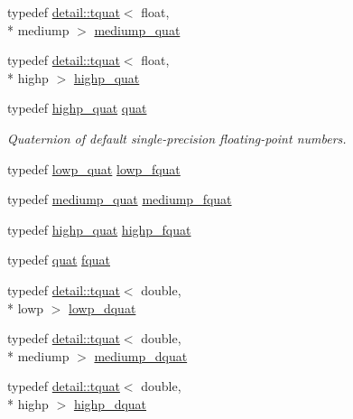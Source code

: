 \begin{DoxyCompactItemize}
typedef \hyperlink{structglm_1_1detail_1_1tquat}{detail\-::tquat}$<$ float, \\*
mediump $>$ \hyperlink{namespaceglm_aa891775f83d9da605b5dd0dc34a3ef62}{mediump\-\_\-quat}
\item 
typedef \hyperlink{structglm_1_1detail_1_1tquat}{detail\-::tquat}$<$ float, \\*
highp $>$ \hyperlink{namespaceglm_a8d2836172e6561f6519c39d0b5d025c1}{highp\-\_\-quat}
\item 
\hypertarget{namespaceglm_ac1f6a5957091b849730ea6f05a6b7ad6}{typedef \hyperlink{namespaceglm_a8d2836172e6561f6519c39d0b5d025c1}{highp\-\_\-quat} \hyperlink{namespaceglm_ac1f6a5957091b849730ea6f05a6b7ad6}{quat}}\label{namespaceglm_ac1f6a5957091b849730ea6f05a6b7ad6}

\begin{DoxyCompactList}\small\item\em Quaternion of default single-\/precision floating-\/point numbers. \end{DoxyCompactList}\item 
typedef \hyperlink{namespaceglm_aefc1d896fa40939955d68b2c68c33cc8}{lowp\-\_\-quat} \hyperlink{namespaceglm_aad1f5b3c348c223fb36e28f646552cff}{lowp\-\_\-fquat}
\item 
typedef \hyperlink{namespaceglm_aa891775f83d9da605b5dd0dc34a3ef62}{mediump\-\_\-quat} \hyperlink{namespaceglm_a154ae157e20a677e5663d97b923b1053}{mediump\-\_\-fquat}
\item 
typedef \hyperlink{namespaceglm_a8d2836172e6561f6519c39d0b5d025c1}{highp\-\_\-quat} \hyperlink{namespaceglm_ad1acf6af4ae4af94dfec8814b058d5eb}{highp\-\_\-fquat}
\item 
typedef \hyperlink{namespaceglm_ac1f6a5957091b849730ea6f05a6b7ad6}{quat} \hyperlink{group__gtc__type__precision_gaa95d73f08018f3864c6ae08dbf1c59f2}{fquat}
\item 
typedef \hyperlink{structglm_1_1detail_1_1tquat}{detail\-::tquat}$<$ double, \\*
lowp $>$ \hyperlink{namespaceglm_ad5f207f07b36f4ebd98338c21b92062e}{lowp\-\_\-dquat}
\item 
typedef \hyperlink{structglm_1_1detail_1_1tquat}{detail\-::tquat}$<$ double, \\*
mediump $>$ \hyperlink{namespaceglm_a302e27293c89ef6128f4eb14ea06ec8b}{mediump\-\_\-dquat}
\item 
typedef \hyperlink{structglm_1_1detail_1_1tquat}{detail\-::tquat}$<$ double, \\*
highp $>$ \hyperlink{namespaceglm_a6504747f6a2ec4a369a51244fcabc61e}{highp\-\_\-dquat}

\end{DoxyCompactItemize}
